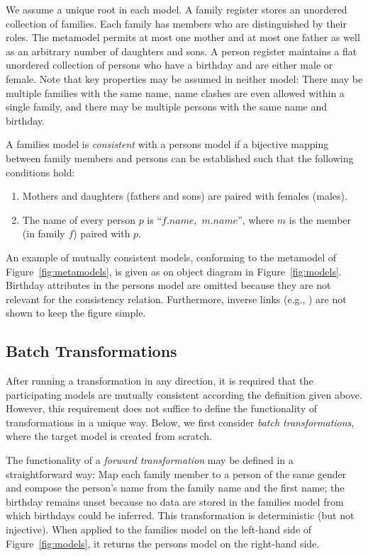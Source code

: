 We assume a unique root in each model. A family register stores an unordered collection of families. Each family has members who are distinguished by their roles. The metamodel permits at most one mother and at most one father as well as an arbitrary number of daughters and sons. A person register maintains a flat unordered collection of persons who have a birthday and are either male or female. Note that key properties may be assumed in neither model: There may be multiple families with the same name, name clashes are even allowed within a single family, and there may be multiple persons with the same name and birthday. 

A families model is \emph{consistent} with a persons model if a bijective mapping between family members and persons can be established such that the following conditions hold:

\begin{enumerate}
	\item  Mothers and daughters (fathers and sons) are paired with females (males).
	\item  The name of every person $p$ is ``$f.name$,~$m.name$'', where $m$ is the member (in family $f$) paired with $p$.
\end{enumerate}

An example of mutually consistent models, conforming to the metamodel of Figure~\ref{fig:metamodels}, is given as on object diagram in Figure~\ref{fig:models}. Birthday attributes in the persons model are omitted because they are not relevant for the consistency relation. Furthermore, inverse links (e.g., ) are not shown to keep the figure simple.



\subsection{Batch Transformations}
\label{sec:BatchTransformations}

After running a transformation in any direction, it is required that the participating models are mutually consistent according the definition given above. However, this requirement does not suffice to define the functionality of transformations in a unique way. Below, we first consider \emph{batch transformations}, where the target model is created from scratch.

The functionality of a \emph{forward transformation} may be defined in a straightforward way: Map each family member to a person of the same gender and compose the person's name from the family name and the first name; the birthday remains unset because no data are stored in the families model from which birthdays could be inferred. This transformation is deterministic (but not injective). When applied to the families model on the left-hand side of Figure~\ref{fig:models}, it returns the persons model on the right-hand side. 

